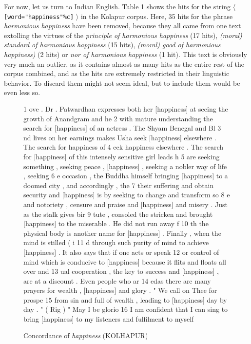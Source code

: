 For now, let us turn to Indian English. Table \ref{fig:happinesskolhapur} shows the hits for the string $\langle$ \texttt{[word="happiness"\%c]} $\rangle$ in the Kolapur corpus. Here, 35 hits for the phrase \textit{harmonious happiness} have been removed, because they all came from one text extolling the virtues of the \textit{principle of harmonious happiness} (17 hits),  \textit{(moral) standard of harmonious happiness} (15 hits),  \textit{(moral) good of harmonious happiness)} (2 hits) or  \textit{nor of harmonious happiness} (1 hit). This text is obviously very much an outlier, as it contains almost as many hits as the entire rest of the corpus combined, and as the hits are extremely restricted in their linguistic behavior. To discard them might not seem ideal, but to include them would be even less so.

\begin{figure}[!htbp]
\caption{Concordance of \textit{happiness} (KOLHAPUR)}
\label{fig:happinesskolhapur}
\begin{fitverb}
 1 ove . Dr . Patwardhan expresses both her [happiness] at seeing the growth of Anandgram and he
 2 with mature understanding the search for [happiness] of an actress . The Shyam Benegal and Bl
 3 nd lives on her earnings makes Usha seek [happiness] elsewhere . The search for happiness of 
 4 eek happiness elsewhere . The search for [happiness] of this intensely sensitive girl leads h
 5  are seeking something , seeking peace , [happiness] , seeking a nobler way of life , seeking
 6 e occasion , the Buddha himself bringing [happiness] to a doomed city , and accordingly , the
 7  their suffering and obtain security and [happiness] is by seeking to change and transform so
 8 e and notoriety , censure and praise and [happiness] and misery . Just as the stalk gives bir
 9 tute , consoled the stricken and brought [happiness] to the miserable . He did not run away f
10 th the physical body is another name for [happiness] . Finally , when the mind is stilled ( i
11 d through such purity of mind to achieve [happiness] . It also says that if one acts or speak
12 or control of mind which is conducive to [happiness] because it flits and floats all over and
13 ual cooperation , the key to success and [happiness] , are at a discount . Even people who ar
14 edas there are many prayers for wealth , [happiness] and glory . " We call on Thee for prospe
15 from sin and full of wealth , leading to [happiness] day by day . " ( Rig ) " May I be glorio
16  I am confident that I can sing to bring [happiness] to my listeners and fulfilment to myself

\end{fitverb}
\end{figure}
